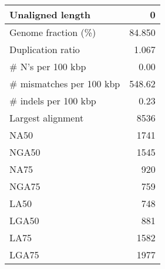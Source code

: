 \documentclass[12pt,a4paper]{article}
\begin{document}
\begin{table}[ht]
\begin{center}
\begin{tabular}{|l*{1}{|r}|}
Unaligned length & 0 \\ \hline
Genome fraction (\%) & 84.850 \\ \hline
Duplication ratio & 1.067 \\ \hline
\# N's per 100 kbp & 0.00 \\ \hline
\# mismatches per 100 kbp & 548.62 \\ \hline
\# indels per 100 kbp & 0.23 \\ \hline
Largest alignment & 8536 \\ \hline
NA50 & 1741 \\ \hline
NGA50 & 1545 \\ \hline
NA75 & 920 \\ \hline
NGA75 & 759 \\ \hline
LA50 & 748 \\ \hline
LGA50 & 881 \\ \hline
LA75 & 1582 \\ \hline
LGA75 & 1977 \\ \hline
\end{tabular}
\end{center}
\end{table}
\end{document}
